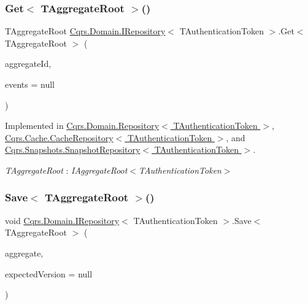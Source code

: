 \subsubsection{\texorpdfstring{Get$<$ T\+Aggregate\+Root $>$()}{Get< TAggregateRoot >()}}
{\footnotesize\ttfamily T\+Aggregate\+Root \hyperlink{interfaceCqrs_1_1Domain_1_1IRepository}{Cqrs.\+Domain.\+I\+Repository}$<$ T\+Authentication\+Token $>$.Get$<$ T\+Aggregate\+Root $>$ (\begin{DoxyParamCaption}\item[{Guid}]{aggregate\+Id,  }\item[{I\+List$<$ \hyperlink{interfaceCqrs_1_1Events_1_1IEvent}{I\+Event}$<$ T\+Authentication\+Token $>$$>$}]{events = {\ttfamily null} }\end{DoxyParamCaption})}



Implemented in \hyperlink{classCqrs_1_1Domain_1_1Repository_ac83c06d643620a087232f5425d7ab1e3_ac83c06d643620a087232f5425d7ab1e3}{Cqrs.\+Domain.\+Repository$<$ T\+Authentication\+Token $>$}, \hyperlink{classCqrs_1_1Cache_1_1CacheRepository_ab0e3de3ba5dcfab8827fed714a8b8944_ab0e3de3ba5dcfab8827fed714a8b8944}{Cqrs.\+Cache.\+Cache\+Repository$<$ T\+Authentication\+Token $>$}, and \hyperlink{classCqrs_1_1Snapshots_1_1SnapshotRepository_acdbea47afc87de1da613a6eff3ceef0f_acdbea47afc87de1da613a6eff3ceef0f}{Cqrs.\+Snapshots.\+Snapshot\+Repository$<$ T\+Authentication\+Token $>$}.

\begin{Desc}
\item[Type Constraints]\begin{description}
\item[{\em T\+Aggregate\+Root} : {\em I\+Aggregate\+Root$<$T\+Authentication\+Token$>$}]\end{description}
\end{Desc}
\mbox{\label{interfaceCqrs_1_1Domain_1_1IRepository_a6086f15a0fef4982da553d24aee04015_a6086f15a0fef4982da553d24aee04015}} 
\subsubsection{\texorpdfstring{Save$<$ T\+Aggregate\+Root $>$()}{Save< TAggregateRoot >()}}
{\footnotesize\ttfamily void \hyperlink{interfaceCqrs_1_1Domain_1_1IRepository}{Cqrs.\+Domain.\+I\+Repository}$<$ T\+Authentication\+Token $>$.Save$<$ T\+Aggregate\+Root $>$ (\begin{DoxyParamCaption}\item[{T\+Aggregate\+Root}]{aggregate,  }\item[{int?}]{expected\+Version = {\ttfamily null} }\end{DoxyParamCaption})}



